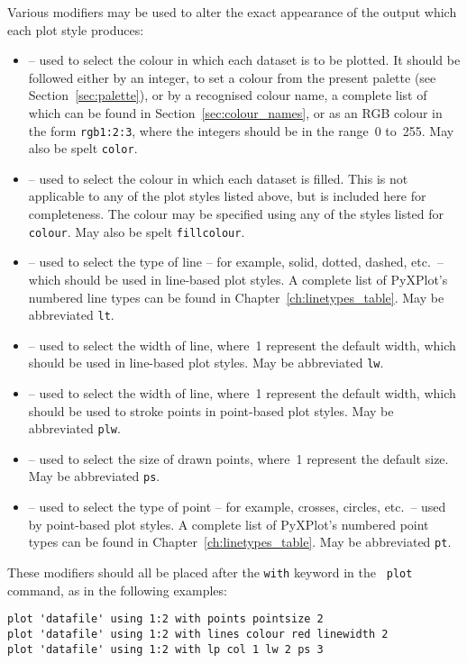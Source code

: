 Various modifiers may be used to alter the exact appearance of the output
which each plot style produces:
\begin{itemize}
\item {} -- used to select the colour in which each dataset is to be plotted. It should be followed either by an integer, to set a colour from the present palette (see Section~\ref{sec:palette}), or by a recognised colour name, a complete list of which can be found in Section~\ref{sec:colour_names}, or as an RGB colour in the form {\tt rgb1:2:3}, where the integers should be in the range~0 to~255. May also be spelt {\tt color}.
\item {} -- used to select the colour in which each dataset is filled. This is not applicable to any of the plot styles listed above, but is included here for completeness. The colour may be specified using any of the styles listed for {\tt colour}. May also be spelt {\tt fillcolour}.
\item {} -- used to select the type of line -- for example, solid, dotted, dashed, etc.\ -- which should be used in line-based plot styles. A complete list of PyXPlot's numbered line types can be found in Chapter~\ref{ch:linetypes_table}. May be abbreviated {\tt lt}.
\item {} -- used to select the width of line, where~1 represent the default width, which should be used in line-based plot styles. May be abbreviated {\tt lw}.
\item {} -- used to select the width of line, where~1 represent the default width, which should be used to stroke points in point-based plot styles. May be abbreviated {\tt plw}.
\item {} -- used to select the size of drawn points, where~1 represent the default size. May be abbreviated {\tt ps}.
\item {} -- used to select the type of point -- for example, crosses, circles, etc.\ -- used by point-based plot styles. A complete list of PyXPlot's numbered point types can be found in Chapter~\ref{ch:linetypes_table}. May be abbreviated {\tt pt}.
\end{itemize}

These modifiers should all be placed after the {\tt with} keyword in the {\tt
plot} command, as in the following examples:

\begin{verbatim}
plot 'datafile' using 1:2 with points pointsize 2
plot 'datafile' using 1:2 with lines colour red linewidth 2
plot 'datafile' using 1:2 with lp col 1 lw 2 ps 3
\end{verbatim}

